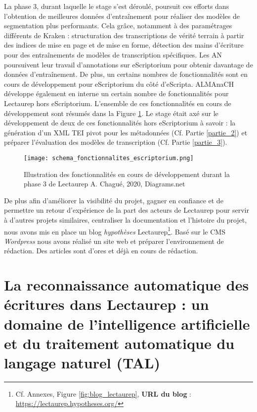 La phase 3, durant laquelle le stage s'est déroulé, poursuit ces efforts dans l'obtention de meilleures données d'entraînement pour réaliser des modèles de segmentation plus performants. Cela grâce, notamment à des paramétrages différents de Kraken : structuration des transcriptions de vérité terrain à partir des indices de mise en page et de mise en forme, détection des mains d'écriture pour des entraînements de modèles de transcription spécifiques. Les AN poursuivent leur travail d'annotations sur eScriptorium pour obtenir davantage de données d'entraînement. De plus, un certains nombres de fonctionnalités sont en cours de développement pour eScriptorium du côté d'eScripta. ALMAnaCH développe également en interne un certain nombre de fonctionnalités pour Lectaurep hors eScriptorium. L'ensemble de ces fonctionnalités en cours de développement sont résumés dans la Figure \ref{fig:fonctionnalites_eScripto}. Le stage était axé sur le développement de deux de ces fonctionnalités hors eScriptorium à savoir : la génération d'un XML TEI pivot pour les métadonnées (Cf. Partie \ref{partie_2}) et préparer l'évaluation des modèles de transcription (Cf. Partie \ref{partie_3}).
\begin{figure}[h!]
  \begin{sideways}
    \texttt{[image: schema\_fonctionnalites\_escriptorium.png]}
  \end{sideways}
  \centering
  \caption{Illustration des fonctionnalités en cours de développement durant la phase 3 de Lectaurep \textcopyright A. Chagué, 2020, Diagrams.net}
  \label{fig:fonctionnalites_eScripto}
\end{figure}
\clearpage
De plus afin d'améliorer la visibilité du projet, gagner en confiance et de permettre un retour d'expérience de la part des acteurs de Lectaurep pour servir à d'autres projets similaires, centraliser la documentation et l'histoire du projet, nous avons mis en place un blog \textit{hypothèses} Lectaurep\footnote{Cf. Annexes, Figure \ref{fig:blog_lectaurep}, \textbf{URL du blog} : \url{https://lectaurep.hypotheses.org/}}. Basé sur le CMS \textit{Wordpress} nous avons réalisé un site web et préparer l'environnement de rédaction. Des articles sont d'ores et déjà en cours de rédaction.

\chapter{La reconnaissance automatique des écritures dans Lectaurep : un domaine de l'intelligence artificielle et du traitement automatique du langage naturel (TAL)}

